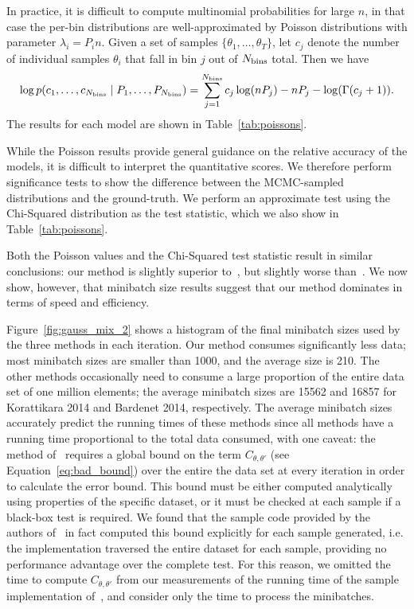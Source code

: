 \documentclass{article}
\begin{document}
In practice, it is difficult to compute multinomial probabilities for large $n$,
in that case the per-bin distributions are well-approximated by Poisson
distributions with parameter $\lambda_i=P_i n$. Given a set of samples
$\{\theta_1,\ldots,\theta_T\}$, let $c_j$ denote the number of individual samples
$\theta_i$ that fall in bin $j$ out of $N_{\rm bins}$ total. Then we have
\begin{equation}\label{eq:log_prob_poissons}
    \log p(c_1, \ldots, c_{N_{\rm bins}} \mid P_1, \ldots, P_{N_{\rm bins}}) = \sum_{j=1}^{N_{\rm bins}} c_j \log (n P_j) - n P_j - \log(\Gamma(c_j+1)).
\end{equation}
The results for each model are shown in Table~\ref{tab:poissons}.

While the Poisson results provide general guidance on the relative accuracy of
the models, it is difficult to interpret the quantitative scores. We therefore
perform significance tests to show the difference between the MCMC-sampled
distributions and the ground-truth.  We perform an approximate test using
the Chi-Squared distribution as the test statistic, which we also show in
Table~\ref{tab:poissons}.

Both the Poisson values and the Chi-Squared test statistic result in similar
conclusions: our method is slightly superior to~\cite{cutting_mh_2014}, but
slightly worse than~\cite{icml2014c1_bardenet14}. We now show, however, that
minibatch size results suggest that our method dominates in terms of speed and
efficiency.

Figure~\ref{fig:gauss_mix_2} shows a histogram of the final minibatch sizes used
by the three methods in each iteration. Our method consumes significantly less
data; most minibatch sizes are smaller than 1000, and the average size is 210.
The other methods occasionally need to consume a large proportion of the
entire data set of one million elements; the average minibatch sizes are 15562
and 16857 for Korattikara 2014 and Bardenet 2014, respectively. The average
minibatch sizes accurately predict the running times of these methods since
all methods have a running time proportional to the total data consumed, with
one caveat: the method of~\cite{icml2014c1_bardenet14} requires a global bound
on the term $C_{\theta,\theta'}$ (see Equation~\ref{eq:bad_bound}) over the
entire the data set at every iteration in order to calculate the error bound.
This bound must be either computed analytically using properties of the specific
dataset, or it must be checked at each sample if a black-box test is required.
We found that the sample code provided by the authors
of~\cite{icml2014c1_bardenet14} in fact computed this bound explicitly for each
sample generated, i.e. the implementation traversed the entire dataset for each
sample, providing no performance advantage over the complete test. For this
reason, we omitted the time to compute $C_{\theta,\theta'}$ from our
measurements of the running time of the sample implementation
of~\cite{icml2014c1_bardenet14}, and consider only the time to process the
minibatches.
\end{document}
